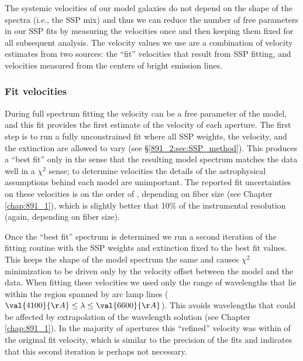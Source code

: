 The systemic velocities of our model galaxies do not depend on the
shape of the spectra (i.e., the SSP mix) and thus we can reduce the
number of free parameters in our SSP fits by measuring the velocities
once and then keeping them fixed for all subsequent analysis. The
velocity values we use are a combination of velocity estimates from
two sources: the ``fit'' velocities that result from SSP fitting, and
velocities measured from the centers of bright emission lines.


\subsubsection{Fit velocities}
During full spectrum fitting the velocity can be a free parameter of
the model, and this fit provides the first estimate of the velocity of
each aperture. The first step is to run a fully unconstrained fit
where all SSP weights, the velocity, and the extinction are allowed to
vary (see \S\ref{891_2:sec:SSP_method}). This produces a ``best fit''
only in the sense that the resulting model spectrum matches the data
well in a $\chi^2$ sense; to determine velocities the details of the
astrophysical assumptions behind each model are unimportant. The
reported fit uncertainties on these velocities is on the order of
, depending on \GP fiber size (see Chapter
\ref{chap:891_1}), which is slightly better that 10\% of the
instrumental resolution (again, depending on fiber size).


Once the ``best fit'' spectrum is determined we run a second iteration
of the fitting routine with the SSP weights and extinction fixed to
the best fit values. This keeps the shape of the model spectrum the
same and causes $\chi^2$ minimization to be driven only by the
velocity offset between the model and the data. When fitting these
velocities we used only the range of wavelengths that lie within the
region spanned by arc lamp lines ($\val{4100}{\AA} \leq\lambda\leq
\val{6600}{\AA}$). This avoids wavelengths that could be affected by
extrapolation of the wavelength solution (see Chapter
\ref{chap:891_1}). In the majority of apertures this ``refined''
velocity was within  of the original fit velocity,
which is similar to the precision of the fits and indicates that this
second iteration is perhaps not necessary.

